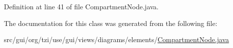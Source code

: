 Definition at line 41 of file Compartment\-Node.\-java.



The documentation for this class was generated from the following file\-:\begin{DoxyCompactItemize}
\item 
src/gui/org/tzi/use/gui/views/diagrams/elements/\hyperlink{_compartment_node_8java}{Compartment\-Node.\-java}\end{DoxyCompactItemize}

